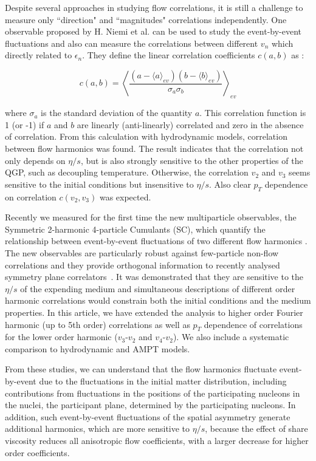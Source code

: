 Despite several approaches in studying flow correlations, it is still a challenge to measure only ``direction" and ``magnitudes" correlations independently. One observable proposed by H. Niemi et al. \cite{PhysRevC.87.054901} can be used to study the event-by-event fluctuations and also can measure the correlations between different $v_n$ which directly related to $\epsilon_n$. They define the linear correlation coefficients $c(a, b)$ as : 

\begin{equation}
	c(a,b) = \left\langle \frac{(a-\langle a \rangle_{ev})(b-\langle b \rangle_{ev})}{\sigma_a \sigma_b} \right \rangle_{ev}
\end{equation}
\smallskip


where $\sigma_a$ is the standard deviation of the quantity $a$. This correlation function is 1 (or -1) if $a$ and $b$ are linearly (anti-linearly) correlated and zero in the absence of correlation. From this calculation with hydrodynamic models, correlation between flow harmonics was found. The result indicates that the correlation not only depends on $\eta/s$, but is also strongly sensitive to the other properties of the QGP, such as decoupling temperature. Otherwise, the correlation $v_2$ and $v_3$ seems sensitive to the initial conditions but insensitive to $\eta/s$. Also clear $p_T$ dependence on correlation $c(v_2, v_3)$ was expected.  

Recently we measured for the first time the new multiparticle observables, the Symmetric 2-harmonic 4-particle Cumulants (SC), which quantify the relationship between event-by-event fluctuations of two different flow harmonics \cite{PhysRevC.89.064904}. The new observables are particularly robust against few-particle non-flow correlations and they provide orthogonal information to recently analysed symmetry plane correlators~\cite{ALICE:2016kpq}. 
It was demonstrated that they are sensitive to the $\eta/s$ of the expending medium and simultaneous descriptions of different order harmonic correlations would constrain 
both the initial conditions and the medium properties.
In this article, we have extended the analysis to higher order Fourier harmonic (up to 5th order) correlations as well as $p_T$ dependence of correlations for the lower order harmonic ($v_3$-$v_2$ and $v_4$-$v_2$).  We also include a systematic comparison to hydrodynamic and AMPT models.
 
   From these studies, we can understand that the flow harmonics fluctuate event-by-event due to the fluctuations in the initial matter distribution, including contributions from fluctuations in the positions of the participating nucleons in the nuclei, the participant plane, determined by the participating nucleons. In addition, such event-by-event fluctuations of the spatial asymmetry generate additional harmonics, which are more sensitive to $\eta /s$, because the effect of share viscosity reduces all anisotropic flow coefficients, with a larger decrease for higher order coefficients.  
 